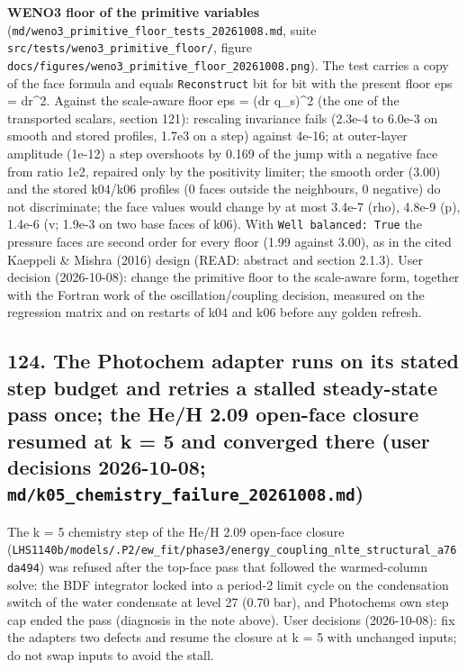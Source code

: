 \documentclass[english,a4paper]{my_memo}
\begin{document}
\textbf{WENO3 floor of the primitive variables} (\texttt{md/weno3\_primitive\_floor\_tests\_20261008.md},
suite \texttt{src/tests/weno3\_primitive\_floor/}, figure \texttt{docs/figures/weno3\_primitive\_floor\_20261008.png}).
The test carries a copy of the face formula and equals \texttt{Reconstruct} bit for bit with the
present floor eps = dr\^{}2. Against the scale-aware floor eps = (dr q\_s)\^{}2 (the one
of the transported scalars, section 121): rescaling invariance fails (2.3e-4 to
6.0e-3 on smooth and stored profiles, 1.7e3 on a step) against 4e-16; at outer-layer
amplitude (1e-12) a step overshoots by 0.169 of the jump with a negative face from
ratio 1e2, repaired only by the positivity limiter; the smooth order (3.00) and the
stored k04/k06 profiles (0 faces outside the neighbours, 0 negative) do not
discriminate; the face values would change by at most 3.4e-7 (rho), 4.8e-9 (p), 1.4e-6
(v; 1.9e-3 on two base faces of k06). With \texttt{Well\ balanced:\ True} the pressure faces are
second order for every floor (1.99 against 3.00), as in the cited Kaeppeli \& Mishra
(2016) design (READ: abstract and section 2.1.3). User decision (2026-10-08): change
the primitive floor to the scale-aware form, together with the Fortran work of the
oscillation/coupling decision, measured on the regression matrix and on restarts of
k04 and k06 before any golden refresh.

\subsection{\texorpdfstring{124. The Photochem adapter runs on its stated step budget and retries a stalled steady-state pass once; the He/H 2.09 open-face closure resumed at k = 5 and converged there (user decisions 2026-10-08; \texttt{md/k05\_chemistry\_failure\_20261008.md})}{124. The Photochem adapter runs on its stated step budget and retries a stalled steady-state pass once; the He/H 2.09 open-face closure resumed at k = 5 and converged there (user decisions 2026-10-08; md/k05\_chemistry\_failure\_20261008.md)}}\label{124-the-photochem-adapter-runs-on-its-stated-step-budget-and-retries-a-stalled-steady-state-pass-once-the-heh-209-open-face-closure-resumed-at-k--5-and-converged-there-user-decisions-2026-10-08-mdk05_chemistry_failure_20261008md}

The k = 5 chemistry step of the He/H 2.09 open-face closure
(\texttt{LHS1140b/models/.P2/ew\_fit/phase3/energy\_coupling\_nlte\_structural\_a76da494}) was
refused after the top-face pass that followed the warmed-column solve: the BDF
integrator locked into a period-2 limit cycle on the condensation switch of the
water condensate at level 27 (0.70 bar), and Photochem\textquotesingle s own step cap ended the pass
(diagnosis in the note above). User decisions (2026-10-08): fix the adapter\textquotesingle s two
defects and resume the closure at k = 5 with unchanged inputs; do not swap inputs to
avoid the stall.
\end{document}
